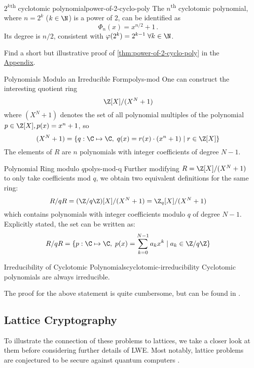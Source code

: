 \begin{theorem}{$2^k$\textsuperscript{th} cyclotomic polynomial}{power-of-2-cyclo-poly}
  The $n$\textsuperscript{th} cyclotomic polynomial, where $n = 2^k$ ($k \in \N$) is a power of $2$,
  can be identified as
  $$\Phi_{n}(x) = x^{n/2} + 1\,.$$
  Its degree is $n/2$, consistent with $\varphi(2^k) = 2^{k-1} \; \forall k \in \N$.
\end{theorem}
Find a short but illustrative proof of \autoref{thm:power-of-2-cyclo-poly} in the \hyperref[chap:appendix]{Appendix}.

\begin{corollary}{Polynomials Modulo an Irreducible Form}{polys-mod}
  One can construct the interesting quotient ring
  $$\Z[X] / (X^N + 1)$$
  where $(X^N + 1)$ denotes the set of all polynomial multiples of the polynomial $p \in \Z[X], p(x) = x^n + 1$, so
  $$(X^N+1) = \{q: \C \mapsto \C,\; q(x) = r(x) \cdot (x^n+1) \;|\; r \in \Z[X]\}$$
  The elements of $R$ are $n$ polynomials with integer coefficients of degree $N-1$.
\end{corollary}

\begin{corollary}{Polynomial Ring modulo $q$}{polys-mod-q}
  Further modifying $R = \Z[X] / (X^N+1)$ to only take coefficients mod $q$, we obtain two equivalent definitions
  for the same ring:
  $$R/qR = (\Z/q\Z)[X] / (X^N+1) = \Z_q[X] / (X^N+1)$$
  which contains polynomials with integer coefficients modulo $q$ of degree $N-1$.
  Explicitly stated, the set can be written as:
  $$R/qR = \{p: \C \mapsto \C,\; p(x) = \sum_{k=0}^{N-1} a_k x^k \;|\; a_k \in \Z/q\Z\}$$
\end{corollary}

\begin{remark}{Irreducibility of Cyclotomic Polynomials}{cyclotomic-irreducibility}
  Cyclotomic polynomials are always irreducible.
\end{remark}
The proof for the above statement is quite cumbersome, but can be found in \cite{2002-serge-algebra}.

\subsection{Lattice Cryptography}
To illustrate the connection of these problems to lattices, we
take a closer look at them before considering further details of LWE.
Most notably, lattice problems are conjectured to be secure against quantum computers \parencite{2018-lattice-problems}.

